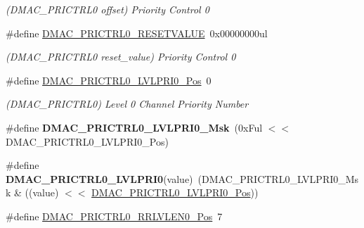 \begin{DoxyCompactItemize}
\begin{DoxyCompactList}\small\item\em (D\+M\+A\+C\+\_\+\+P\+R\+I\+C\+T\+R\+L0 offset) Priority Control 0 \end{DoxyCompactList}\item 
\hypertarget{group___s_a_m_l21___d_m_a_c_ga3bb10cceee21f0a475133f8479b3ec81}{}\#define \hyperlink{group___s_a_m_l21___d_m_a_c_ga3bb10cceee21f0a475133f8479b3ec81}{D\+M\+A\+C\+\_\+\+P\+R\+I\+C\+T\+R\+L0\+\_\+\+R\+E\+S\+E\+T\+V\+A\+L\+U\+E}~0x00000000ul\label{group___s_a_m_l21___d_m_a_c_ga3bb10cceee21f0a475133f8479b3ec81}

\begin{DoxyCompactList}\small\item\em (D\+M\+A\+C\+\_\+\+P\+R\+I\+C\+T\+R\+L0 reset\+\_\+value) Priority Control 0 \end{DoxyCompactList}\item 
\hypertarget{group___s_a_m_l21___d_m_a_c_gaa0eb3b5f2adbdf3f6268cfbd65dee2ff}{}\#define \hyperlink{group___s_a_m_l21___d_m_a_c_gaa0eb3b5f2adbdf3f6268cfbd65dee2ff}{D\+M\+A\+C\+\_\+\+P\+R\+I\+C\+T\+R\+L0\+\_\+\+L\+V\+L\+P\+R\+I0\+\_\+\+Pos}~0\label{group___s_a_m_l21___d_m_a_c_gaa0eb3b5f2adbdf3f6268cfbd65dee2ff}

\begin{DoxyCompactList}\small\item\em (D\+M\+A\+C\+\_\+\+P\+R\+I\+C\+T\+R\+L0) Level 0 Channel Priority Number \end{DoxyCompactList}\item 
\hypertarget{group___s_a_m_l21___d_m_a_c_gade1a0ef6a31ea2b86895becdd6d23def}{}\#define {\bfseries D\+M\+A\+C\+\_\+\+P\+R\+I\+C\+T\+R\+L0\+\_\+\+L\+V\+L\+P\+R\+I0\+\_\+\+Msk}~(0x\+Ful $<$$<$ D\+M\+A\+C\+\_\+\+P\+R\+I\+C\+T\+R\+L0\+\_\+\+L\+V\+L\+P\+R\+I0\+\_\+\+Pos)\label{group___s_a_m_l21___d_m_a_c_gade1a0ef6a31ea2b86895becdd6d23def}

\item 
\hypertarget{group___s_a_m_l21___d_m_a_c_ga0c033a23dd0f3129f30d911c9633c47c}{}\#define {\bfseries D\+M\+A\+C\+\_\+\+P\+R\+I\+C\+T\+R\+L0\+\_\+\+L\+V\+L\+P\+R\+I0}(value)~(D\+M\+A\+C\+\_\+\+P\+R\+I\+C\+T\+R\+L0\+\_\+\+L\+V\+L\+P\+R\+I0\+\_\+\+Msk \& ((value) $<$$<$ \hyperlink{group___s_a_m_l21___d_m_a_c_gaa0eb3b5f2adbdf3f6268cfbd65dee2ff}{D\+M\+A\+C\+\_\+\+P\+R\+I\+C\+T\+R\+L0\+\_\+\+L\+V\+L\+P\+R\+I0\+\_\+\+Pos}))\label{group___s_a_m_l21___d_m_a_c_ga0c033a23dd0f3129f30d911c9633c47c}

\item 
\hypertarget{group___s_a_m_l21___d_m_a_c_gaa401d582ea85002f03463ef96888d0f8}{}\#define \hyperlink{group___s_a_m_l21___d_m_a_c_gaa401d582ea85002f03463ef96888d0f8}{D\+M\+A\+C\+\_\+\+P\+R\+I\+C\+T\+R\+L0\+\_\+\+R\+R\+L\+V\+L\+E\+N0\+\_\+\+Pos}~7\label{group___s_a_m_l21___d_m_a_c_gaa401d582ea85002f03463ef96888d0f8}


\end{DoxyCompactItemize}
